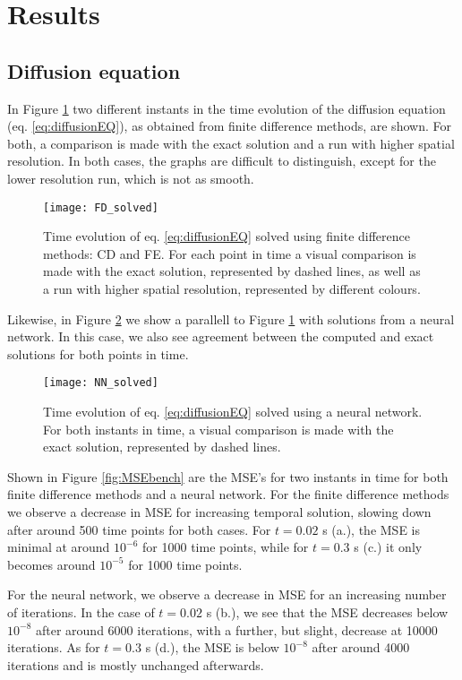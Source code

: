 \section{Results}
\label{sec:results}

\subsection{Diffusion equation}

In Figure \ref{fig:FDcompare} two different instants in the time evolution of the diffusion equation (eq. \ref{eq:diffusionEQ}), as obtained from finite difference methods, are shown. For both, a comparison is made with the exact solution and a run with higher spatial resolution. In both cases, the graphs are difficult to distinguish, except for the lower resolution run, which is not as smooth.
 \begin{figure}[htbp]
  	\centering
  	\texttt{[image: FD\_solved]}
  	\caption{Time evolution of eq. \ref{eq:diffusionEQ} solved using finite difference methods: CD and FE. For each point in time a visual comparison is made with the exact solution, represented by dashed lines, as well as a run with higher spatial resolution, represented by different colours.}
   \label{fig:FDcompare}
 \end{figure}

Likewise, in Figure \ref{fig:NNcompare} we show a parallell to Figure \ref{fig:FDcompare} with solutions from a neural network. In this case, we also see agreement between the computed and exact solutions for both points in time.
 \begin{figure}[htbp]
  	\centering
  	\texttt{[image: NN\_solved]}
  	\caption{Time evolution of eq. \ref{eq:diffusionEQ} solved using a neural network. For both instants in time, a visual comparison is made with the exact solution, represented by dashed lines.}
   \label{fig:NNcompare}
 \end{figure}

Shown in Figure \ref{fig:MSEbench} are the MSE's for two instants in time for both finite difference methods and a neural network. For the finite difference methods we observe a decrease in MSE for increasing temporal solution, slowing down after around 500 time points for both cases. For $t=0.02$ s (a.), the MSE is minimal at around $10^{-6}$ for 1000 time points, while for $t=0.3$ s (c.) it only becomes around $10^{-5}$ for 1000 time points.

For the neural network, we observe a decrease in MSE for an increasing number of iterations. In the case of $t=0.02$ s (b.), we see that the MSE decreases below $10^{-8}$ after around 6000 iterations, with a further, but slight, decrease at 10000 iterations. As for $t=0.3$ s (d.), the MSE is below $10^{-8}$ after around 4000 iterations and is mostly unchanged afterwards.

